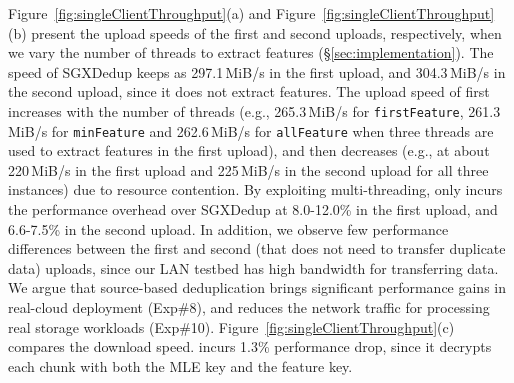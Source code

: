 Figure~\ref{fig:singleClientThroughput}(a) and Figure~\ref{fig:singleClientThroughput}(b) present the upload speeds of the first and second uploads, respectively, when we vary the number of threads to extract features (\S\ref{sec:implementation}). The speed of SGXDedup keeps as 297.1\,MiB/s in the first upload, and 304.3\,MiB/s in the second upload, since it does not extract features. The upload speed of \prototype first increases with the number of threads (e.g., 265.3\,MiB/s for {\tt firstFeature}, 261.3\,MiB/s for {\tt minFeature} and 262.6\,MiB/s for {\tt allFeature} when three threads are used to extract features in the first upload), and then decreases (e.g., at about 220\,MiB/s in the first upload and 225\,MiB/s in the second upload for all three instances) due to resource contention. By exploiting multi-threading, \prototype only incurs the performance overhead over SGXDedup at 8.0-12.0\% in the first upload, and 6.6-7.5\% in the second upload.
In addition, we  observe few performance differences between the first and second (that does not need to transfer duplicate data) uploads, since our LAN testbed has high  bandwidth for transferring data. We argue that source-based deduplication brings significant performance gains in real-cloud deployment (Exp\#8), and reduces the network traffic for processing real storage workloads (Exp\#10).
Figure~\ref{fig:singleClientThroughput}(c) compares the download speed. \prototype incurs 1.3\% performance drop, since it decrypts each chunk with both the MLE key and the feature key.



